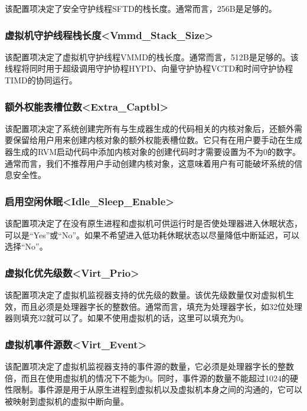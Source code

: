 该配置项决定了安全守护线程SFTD的栈长度。通常而言，256B是足够的。

\subsubsection{虚拟机守护线程栈长度<Vmmd\_Stack\_Size>{}}\label{subsubsec:5-3-13-5}

该配置项决定了虚拟机守护线程VMMD的栈长度。通常而言，512B是足够的。该线程将同时用于超级调用守护协程HYPD、向量守护协程VCTD和时间守护协程TIMD的协同运行。

\subsubsection{额外权能表槽位数<Extra\_Captbl>{}}\label{subsubsec:5-3-13-6}

该配置项决定了系统创建完所有与生成器生成的代码相关的内核对象后，还额外需要保留给用户用来创建内核对象的额外权能表槽位数。它只有在用户要手动在生成器生成的RVM启动代码中添加内核对象的创建代码时才需要设置为不为0的数字。通常而言，我们不推荐用户手动创建内核对象，这意味着用户有可能破坏系统的信息安全性。

\subsubsection{启用空闲休眠<Idle\_Sleep\_Enable>{}}\label{subsubsec:5-3-13-7}

该配置项决定了在没有原生进程和虚拟机可供运行时是否使处理器进入休眠状态，可以是``Yes''或``No''。如果不希望进入低功耗休眠状态以尽量降低中断延迟，可以选择``No''。

\subsubsection{虚拟化优先级数<Virt\_Prio>{}}\label{subsubsec:5-3-13-8}

该配置项决定了虚拟机监视器支持的优先级的数量。该优先级数量仅对虚拟机生效，而且必须是处理器字长的整数倍。通常而言，填充为处理器字长，如32位处理器则填充32就可以了。如果不使用虚拟机的话，这里可以填充为0。

\subsubsection{虚拟机事件源数<Virt\_Event>{}}\label{subsubsec:5-3-13-9}

该配置项决定了虚拟机监视器支持的事件源的数量，它必须是处理器字长的整数倍，而且在使用虚拟机的情况下不能为0。同时，事件源的数量不能超过1024的硬性限制。事件源是用于从原生进程到虚拟机以及虚拟机本身之间的沟通的，它可以被映射到虚拟机的虚拟中断向量。

